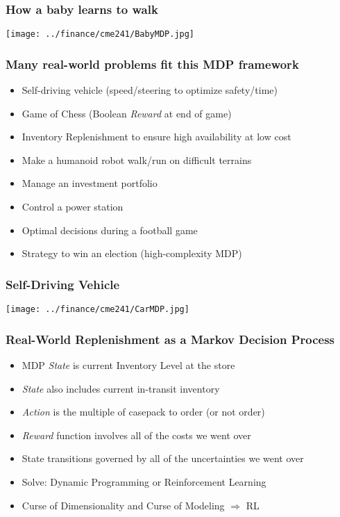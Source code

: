 \documentclass[handout]{beamer}
\begin{document}
\begin{frame}
\frametitle{How a baby learns to walk}
\texttt{[image: ../finance/cme241/BabyMDP.jpg]}
\end{frame}

\begin{frame}
\frametitle{Many real-world problems fit this MDP framework}
\pause
\begin{itemize}[<+->]
\item Self-driving vehicle (speed/steering to optimize safety/time)
\item Game of Chess (Boolean {\em Reward} at end of game)
\item Inventory Replenishment to ensure high availability at low cost
\item Make a humanoid robot walk/run on difficult terrains
\item Manage an investment portfolio
\item Control a power station
\item Optimal decisions during a football game
\item Strategy to win an election (high-complexity MDP)
\end{itemize}
\end{frame}

\begin{frame}
\frametitle{Self-Driving Vehicle}
\texttt{[image: ../finance/cme241/CarMDP.jpg]}
\end{frame}

\begin{frame}
\frametitle{Real-World Replenishment as a Markov Decision Process}
\pause
\begin{itemize}[<+->]
\item MDP {\em State} is current Inventory Level at the store
\item {\em State} also includes current in-transit inventory
\item {\em Action} is the multiple of casepack to order (or not order)
\item {\em Reward} function involves all of the costs we went over
\item State transitions governed by all of the uncertainties we went over
\item Solve: Dynamic Programming or Reinforcement Learning
\item Curse of Dimensionality and Curse of Modeling $\Rightarrow$ RL
\end{itemize}
\end{frame}
\end{document}
